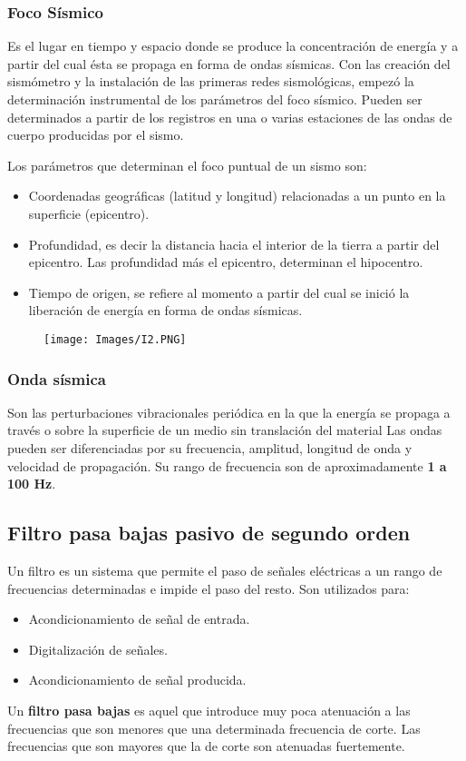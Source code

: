 \documentclass[12pt]{article}
\begin{document}
    	    \subsubsection{Foco Sísmico}
    	    Es el lugar en tiempo y espacio donde se produce la concentración de energía y a partir del cual ésta se propaga en forma de ondas sísmicas. Con las creación del sismómetro y la instalación de las primeras redes sismológicas, empezó la determinación instrumental de los parámetros del foco sísmico. Pueden ser determinados a partir de los registros en una o varias estaciones de las ondas de cuerpo producidas por el sismo.
    	    
    	    Los parámetros que determinan el foco puntual de un sismo son:
    	    \begin{itemize}
    	        \item Coordenadas geográficas (latitud y longitud) relacionadas a un punto en la superficie (epicentro).
    	        \item Profundidad, es decir la distancia hacia el interior de la tierra a partir del epicentro. Las profundidad más el epicentro, determinan el hipocentro.
    	        \item Tiempo de origen, se refiere al momento a partir del cual se inició la liberación de energía en forma de ondas sísmicas.
    	    \end{itemize}
    	    \begin{figure}[H]
    	       \centering
    	       \texttt{[image: Images/I2.PNG]}
    	   \end{figure}
    	   
    	   \subsubsection{Onda sísmica}
    	   Son las perturbaciones vibracionales periódica en la que la energía se propaga a través o sobre la superficie de un medio sin translación del material Las ondas pueden ser diferenciadas por su frecuencia, amplitud, longitud de onda y velocidad de propagación. Su rango de frecuencia son de aproximadamente \textbf{1 a 100 Hz}.
	    \subsection{Filtro pasa bajas pasivo de segundo orden}
        Un filtro es un sistema que permite el paso de señales eléctricas a un  rango de frecuencias determinadas e impide el paso del resto. Son utilizados para:
        \begin{itemize}
            \item Acondicionamiento de señal de entrada.
            \item Digitalización de señales.
            \item Acondicionamiento de señal producida.
        \end{itemize}
        Un \textbf{filtro pasa bajas} es aquel que introduce muy poca atenuación a las frecuencias que son menores que una determinada frecuencia de corte. Las frecuencias que son mayores que la de corte son atenuadas fuertemente.
        
\end{document}
